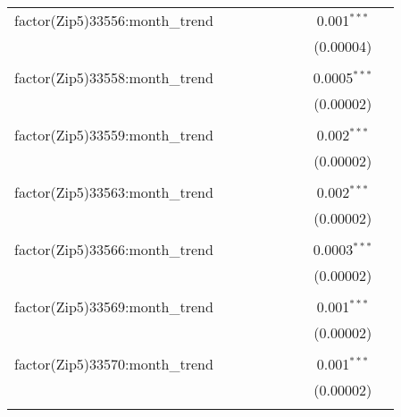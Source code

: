 \begin{table}[H]
{\begin{tabular}{@{\extracolsep{5pt}}lcccccccc}
  factor(Zip5)33556:month\_trend &  &  &  &  &  &  & 0.001$^{***}$ &  \\  

   &  &  &  &  &  &  & (0.00004) &  \\  

   & & & & & & & & \\  

  factor(Zip5)33558:month\_trend &  &  &  &  &  &  & 0.0005$^{***}$ &  \\  

   &  &  &  &  &  &  & (0.00002) &  \\  

   & & & & & & & & \\  

  factor(Zip5)33559:month\_trend &  &  &  &  &  &  & 0.002$^{***}$ &  \\  

   &  &  &  &  &  &  & (0.00002) &  \\  

   & & & & & & & & \\  

  factor(Zip5)33563:month\_trend &  &  &  &  &  &  & 0.002$^{***}$ &  \\  

   &  &  &  &  &  &  & (0.00002) &  \\  

   & & & & & & & & \\  

  factor(Zip5)33566:month\_trend &  &  &  &  &  &  & 0.0003$^{***}$ &  \\  

   &  &  &  &  &  &  & (0.00002) &  \\  

   & & & & & & & & \\  

  factor(Zip5)33569:month\_trend &  &  &  &  &  &  & 0.001$^{***}$ &  \\  

   &  &  &  &  &  &  & (0.00002) &  \\  

   & & & & & & & & \\  

  factor(Zip5)33570:month\_trend &  &  &  &  &  &  & 0.001$^{***}$ &  \\  

   &  &  &  &  &  &  & (0.00002) &  \\  

   & & & & & & & & \\  


\end{tabular}}
\end{table}
